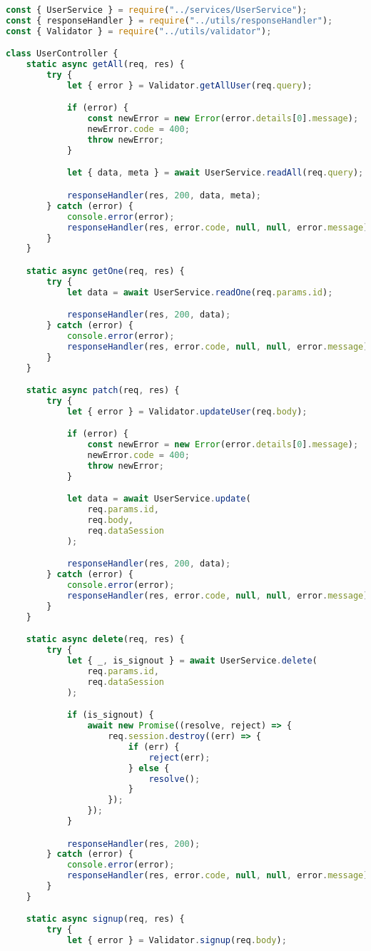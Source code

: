 \begin{lstlisting}[language=Javascript,caption={User Controller}]
const { UserService } = require("../services/UserService");
const { responseHandler } = require("../utils/responseHandler");
const { Validator } = require("../utils/validator");

class UserController {
	static async getAll(req, res) {
		try {
			let { error } = Validator.getAllUser(req.query);

			if (error) {
				const newError = new Error(error.details[0].message);
				newError.code = 400;
				throw newError;
			}

			let { data, meta } = await UserService.readAll(req.query);

			responseHandler(res, 200, data, meta);
		} catch (error) {
			console.error(error);
			responseHandler(res, error.code, null, null, error.message);
		}
	}

	static async getOne(req, res) {
		try {
			let data = await UserService.readOne(req.params.id);

			responseHandler(res, 200, data);
		} catch (error) {
			console.error(error);
			responseHandler(res, error.code, null, null, error.message);
		}
	}

	static async patch(req, res) {
		try {
			let { error } = Validator.updateUser(req.body);

			if (error) {
				const newError = new Error(error.details[0].message);
				newError.code = 400;
				throw newError;
			}

			let data = await UserService.update(
				req.params.id,
				req.body,
				req.dataSession
			);

			responseHandler(res, 200, data);
		} catch (error) {
			console.error(error);
			responseHandler(res, error.code, null, null, error.message);
		}
	}

	static async delete(req, res) {
		try {
			let { _, is_signout } = await UserService.delete(
				req.params.id,
				req.dataSession
			);

			if (is_signout) {
				await new Promise((resolve, reject) => {
					req.session.destroy((err) => {
						if (err) {
							reject(err);
						} else {
							resolve();
						}
					});
				});
			}

			responseHandler(res, 200);
		} catch (error) {
			console.error(error);
			responseHandler(res, error.code, null, null, error.message);
		}
	}

	static async signup(req, res) {
		try {
			let { error } = Validator.signup(req.body);


\end{lstlisting}
